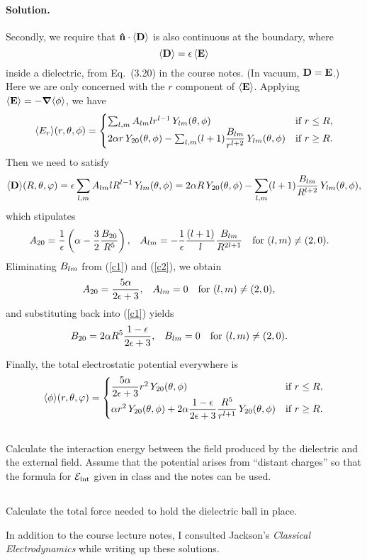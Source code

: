 \documentclass[11pt]{article}
\newcommand{\refeq}[1]{(\ref{#1})}
\newcommand{\beq}{\begin{equation*}}
\newcommand{\eeq}{\end{equation*}}
\newenvironment{problem}
{
	\subsection{}
	\color{darkgray}
    \ignorespaces
}
{

}
\newenvironment{solution}
{
    \paragraph{Solution.}
    \ignorespaces
}
{
    \bigskip
}
\begin{document}
\begin{solution}
	Secondly, we require that $\nh \cdot \evD$ is also continuous at the boundary, where
	\beq
		\evD = \eps \evE
	\eeq
	inside a dielectric, from Eq.~(3.20) in the course notes.  (In vacuum, $\vb{D} = \vb{E}$.)  Here we are only concerned with the $r$ component of $\evE$.  Applying $\evE = -\grad\!\evphi$, we have
	\beq
		\evEr\!(r, \tht, \phi) = \begin{cases} \sum_{l,m} \Alm l r^{l-1} \, \Ylm\tv & \tif r \leq R, \\
		2 \alp r \, Y_{2 0}\tv - \sum_{l,m} (l + 1) \dfrac{\Blm}{r^{l+2}} \, \Ylm\tv & \tif r \geq R. \end{cases}
	\eeq
	Then we need to satisfy
	\beq
		\evD\!(R, \tht, \vph) = \eps \sum_{l,m} \Alm l R^{l-1} \, \Ylm\tv = 2 \alp R \, Y_{2 0}\tv - \sum_{l,m} (l + 1) \dfrac{\Blm}{R^{l+2}} \, \Ylm\tv,
	\eeq
	which stipulates
	\begin{align} \label{c2}
		A_{2 0} &= \frac{1}{\epsilon} \left( \alpha - \frac{3}{2} \frac{B_{2 0}}{R^{5}} \right), &
		A_{l m} &= -\frac{1}{\epsilon} \frac{(l + 1)}{l} \frac{B_{l m}}{R^{2l+1}} \quad \text{for } (l,m) \neq (2,0).
	\end{align}
	Eliminating $B_{l m}$ from \refeq{c1} and \refeq{c2}, we obtain
	\begin{align*}
		A_{2 0} &= \frac{5 \alpha}{2\epsilon + 3}, &
		A_{l m} &= 0 \quad \text{for } (l,m) \neq (2,0),
	\end{align*}
	and substituting back into \refeq{c1} yields
	\begin{align*}
		B_{2 0} &= 2 \alpha R^5 \frac{1 - \epsilon}{2\epsilon + 3}, &
		B_{l m} &= 0 \quad \text{for } (l,m) \neq (2,0).
	\end{align*}
	
	Finally, the total electrostatic potential everywhere is
	\beq
		\evphi\!(r, \tht, \vph) = \begin{cases} \dfrac{5 \alp}{2\eps + 3} r^2 \, Y_{2 0}\tv & \tif r \leq R, \\
		\alp r^2 \, Y_{2 0}\tv + 2 \alp \dfrac{1 - \eps}{2\eps + 3} \dfrac{R^5}{r^{l+1}} \, Y_{2 0}\tv & \tif r \geq R. \end{cases}
	\eeq
\end{solution}

\begin{problem}
	Calculate the interaction energy between the field produced by the dielectric and the external field.  Assume that the potential arises from ``distant charges'' so that the formula for $\mathcal{E}_\text{int}$ given in class and the notes can be used.
\end{problem}

\begin{problem}
	Calculate the total force needed to hold the dielectric ball in place.
\end{problem}



\vfill
In addition to the course lecture notes, I consulted Jackson's \emph{Classical Electrodynamics} while writing up these solutions.
\end{document}
